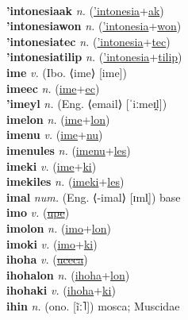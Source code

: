  \label{'intonesia} \\
\textbf{'intonesiaak} \textit{n.} (\hyperref['intonesia]{'intonesia}+\hyperref[ak]{ak})
 \label{'intonesiaak} \\
\textbf{'intonesiawon} \textit{n.} (\hyperref['intonesia]{'intonesia}+\hyperref[won]{won})
 \label{'intonesiawon} \\
\textbf{'intonesiatec} \textit{n.} (\hyperref['intonesia]{'intonesia}+\hyperref[tec]{tec})
 \label{'intonesiatec} \\
\textbf{'intonesiatilip} \textit{n.} (\hyperref['intonesia]{'intonesia}+\hyperref[tilip]{tilip})
 \label{'intonesiatilip} \\
\textbf{ime} \textit{v.} (Ibo. ⟨ime⟩ [ime])
 \label{ime} \\
\textbf{imeec} \textit{n.} (\hyperref[ime]{ime}+\hyperref[ec]{ec})
 \label{imeec} \\
\textbf{'imeyl} \textit{n.} (Eng. ⟨email⟩ [ˈiːmeɪ̯l])
 \label{'imeyl} \\
\textbf{imelon} \textit{n.} (\hyperref[ime]{ime}+\hyperref[lon]{lon})
 \label{imelon} \\
\textbf{imenu} \textit{v.} (\hyperref[ime]{ime}+\hyperref[nu]{nu})
 \label{imenu} \\
\textbf{imenules} \textit{n.} (\hyperref[imenu]{imenu}+\hyperref[les]{les})
 \label{imenules} \\
\textbf{imeki} \textit{v.} (\hyperref[ime]{ime}+\hyperref[ki]{ki})
 \label{imeki} \\
\textbf{imekiles} \textit{n.} (\hyperref[imeki]{imeki}+\hyperref[les]{les})
 \label{imekiles} \\
\textbf{imal} \textit{num.} (Eng. ⟨-imal⟩ [ɪml̩])
base \label{imal} \\
\textbf{imo} \textit{v.} (\hyperref[upe]{\sout{upe}})
 \label{imo} \\
\textbf{imolon} \textit{n.} (\hyperref[imo]{imo}+\hyperref[lon]{lon})
 \label{imolon} \\
\textbf{imoki} \textit{v.} (\hyperref[imo]{imo}+\hyperref[ki]{ki})
 \label{imoki} \\
\textbf{ihoha} \textit{v.} (\hyperref[uceca]{\sout{uceca}})
 \label{ihoha} \\
\textbf{ihohalon} \textit{n.} (\hyperref[ihoha]{ihoha}+\hyperref[lon]{lon})
 \label{ihohalon} \\
\textbf{ihohaki} \textit{v.} (\hyperref[ihoha]{ihoha}+\hyperref[ki]{ki})
 \label{ihohaki} \\
\textbf{ihin} \textit{n.} (ono. [ĩː˥])
mosca; Muscidae \label{ihin} \\

